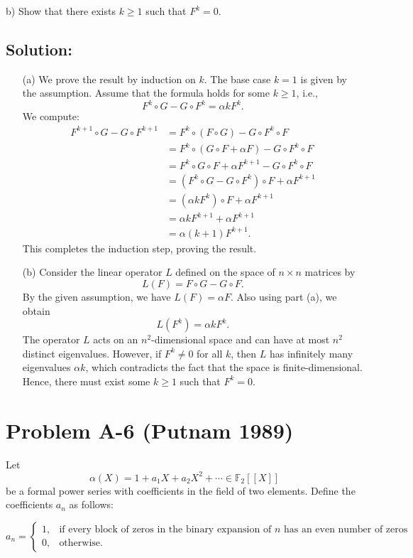 \documentclass[11pt, a4paper, oneside]{article}
\newcommand{\problem}[1][]{\section{#1} \hfill \par}
\newcommand{\solution}[1][]{\subsection*{#1}\hfill \par}
\theoremstyle{remark}
\theoremstyle{lemma}
\begin{document}
b) Show that there exists \( k \geq 1 \) such that \( F^k = 0 \).
\solution[Solution:]
\begin{enumerate}
    \item[(a)] We prove the result by induction on $k$. The base case $k = 1$ is given by the assumption. Assume that the formula holds for some $k \geq 1$, i.e.,
    \[
    F^k \circ G - G \circ F^k = \alpha k F^k.
    \]
    We compute:
    \begin{align*}
        F^{k+1} \circ G - G \circ F^{k+1} 
        &= F^k \circ(F \circ G) - G \circ F^k \circ F \\
        &= F^k \circ(G \circ F + \alpha F) - G \circ F^k\circ F \\
        &= F^k\circ G \circ F + \alpha F^{k+1} - G \circ F^{k}\circ F \\
        &= (F^k \circ G - G\circ F^k) \circ F + \alpha F^{k+1} \\
        &= (\alpha k F^k) \circ F + \alpha F^{k+1} \\
        &= \alpha k F^{k+1} + \alpha F^{k+1} \\
        &= \alpha (k+1) F^{k+1}.
    \end{align*}
    This completes the induction step, proving the result.

    \item[(b)] Consider the linear operator $L$ defined on the space of $n \times n$ matrices by
    \[
    L(F) = F \circ G - G \circ F.
    \]
    By the given assumption, we have $L(F) = \alpha F$. Also using part (a), we obtain
    \[
    L(F^k) = \alpha k F^k.
    \]
    The operator $L$ acts on an $n^2$-dimensional space and can have at most $n^2$ distinct eigenvalues. However, if $F^k \neq 0$ for all $k$, then $L$ has infinitely many eigenvalues $\alpha k$, which contradicts the fact that the space is finite-dimensional. Hence, there must exist some $k \geq 1$ such that $F^k = 0$.
\end{enumerate}
\newpage
\problem[Problem A-6 (Putnam 1989)]

Let 
\[
\alpha(X) = 1 + a_1 X + a_2 X^2 + \cdots \in \mathbb{F}_2[[X]]
\]
be a formal power series with coefficients in the field of two elements. Define the coefficients \( a_n \) as follows:

\[
a_n =
\begin{cases} 
1, & \text{if every block of zeros in the binary expansion of } n \text{ has an even number of zeros} \\
0, & \text{otherwise}.
\end{cases}
\]
\end{document}
